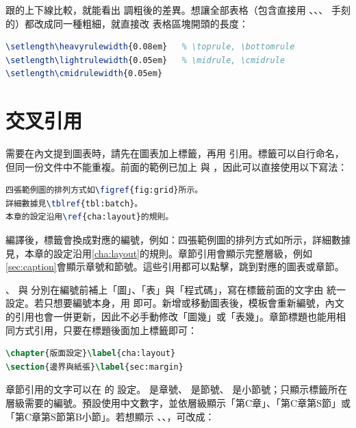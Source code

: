 跟的上下線比較，就能看出  調粗後的差異。想讓全部表格（包含直接用 \code{\toprule}、\code{\midrule}、\code{\bottomrule}、\code{\cmidrule} 手刻的）都改成同一種粗細，就直接改  表格區塊開頭的長度：

\begin{lstlisting}[language=latex]
\setlength\heavyrulewidth{0.08em}   % \toprule, \bottomrule
\setlength\lightrulewidth{0.05em}   % \midrule, \cmidrule
\setlength\cmidrulewidth{0.05em}
\end{lstlisting}

\section{交叉引用}

需要在內文提到圖表時，請先在圖表加上標籤，再用 \code{\ref} 引用。標籤可以自行命名，但同一份文件中不能重複。前面的範例已加上  與 ，因此可以直接使用以下寫法：

\begin{lstlisting}[language=latex]
四張範例圖的排列方式如\figref{fig:grid}所示。
詳細數據見\tblref{tbl:batch}。
本章的設定沿用\ref{cha:layout}的規則。
\end{lstlisting}

編譯後，標籤會換成對應的編號，例如：四張範例圖的排列方式如所示，詳細數據見，本章的設定沿用\ref{cha:layout}的規則。章節引用會顯示完整層級，例如\ref{sec:caption}會顯示章號和節號。這些引用都可以點擊，跳到對應的圖表或章節。

\code{\figref}、\code{\tblref} 與 \code{\lstref} 分別在編號前補上「圖」、「表」與「程式碼」，寫在標籤前面的文字由  統一設定。若只想要編號本身，用 \code{\ref} 即可。新增或移動圖表後，模板會重新編號，內文的引用也會一併更新，因此不必手動修改「圖幾」或「表幾」。章節標題也能用相同方式引用，只要在標題後面加上標籤即可：

\begin{lstlisting}[language=latex]
\chapter{版面設定}\label{cha:layout}
\section{邊界與紙張}\label{sec:margin}
\end{lstlisting}

章節引用的文字可以在  的  設定。 是章號、 是節號、 是小節號；只顯示標籤所在層級需要的編號。預設使用中文數字，並依層級顯示「第C章」、「第C章第S節」或「第C章第S節第B小節」。若想顯示 、、，可改成：

